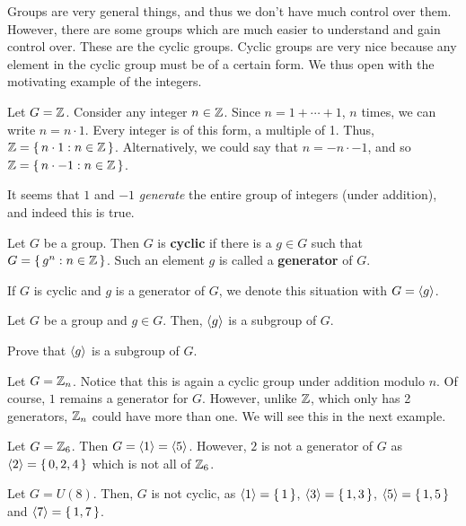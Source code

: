 \documentclass[./algebra-notes.tex]{subfiles}
\begin{document}
Groups are very general things, and thus we don't have much control over them.
However, there are some groups which are much easier to understand and gain
control over. These are the cyclic groups. Cyclic groups are very nice because
any element in the cyclic group must be of a certain form. We thus open with the
motivating example of the integers. 
\begin{example}
    Let $G = \mathbb{Z}$. Consider any integer $n \in \mathbb{Z}$. Since $n = 1 + \cdots + 1$,
    $n$ times, we can write $n = n \cdot 1$. Every integer is of this form, a
    multiple of 1. Thus, $\mathbb{Z} = \set{n \cdot 1 : n \in \mathbb{Z}}$. Alternatively, we
    could say that $n = -n \cdot -1$, and so $\mathbb{Z} = \set{n \cdot -1: n \in
    \mathbb{Z}}$. 
\end{example}
It seems that $1$ and $-1$ \emph{generate} the entire group of integers (under
addition), and indeed this is true. 

\begin{definition}
    Let $G$ be a group. Then $G$ is \textbf{cyclic} if there is a $g \in G$ such
    that $G = \set{g^n : n \in \mathbb{Z}}$. Such an element $g$ is called a
    \textbf{generator} of $G$.
\end{definition}
If $G$ is cyclic and $g$ is a generator of $G$, we denote this situation with $G =
{ \langle g \rangle }$. 

\begin{example}
    Let $G$ be a group and $g \in G$. Then, ${ \langle g \rangle }$ is a subgroup of $G$.
\end{example}
\begin{exercise}
    Prove that ${ \langle g \rangle }$ is a subgroup of $G$.
\end{exercise}

\begin{example}
    Let $G = \mathbb{Z}_n$. Notice that this is again a cyclic group under addition
    modulo $n$. Of course, $1$ remains a generator for $G$. However, unlike
    $\mathbb{Z}$, which only has 2 generators, $\mathbb{Z}_n$ could have more than one. We
    will see this in the next example.
\end{example}

\begin{example}
    Let $G = \mathbb{Z}_6$. Then $G = { \langle 1 \rangle } = { \langle 5 \rangle }$. However, $2$ is not a
    generator of $G$ as ${ \langle 2 \rangle } = \set{0, 2, 4}$ which is not all of $\mathbb{Z}_6$.
\end{example}

\begin{example}
    Let $G = U(8)$. Then, $G$ is not cyclic, as ${ \langle 1 \rangle } = \set{1}$, ${ \langle 3 \rangle } =
    \set{1, 3}$, ${ \langle 5 \rangle } = \set{1,5}$ and ${ \langle 7 \rangle } = \set{1,7}$.
\end{example}
\end{document}
